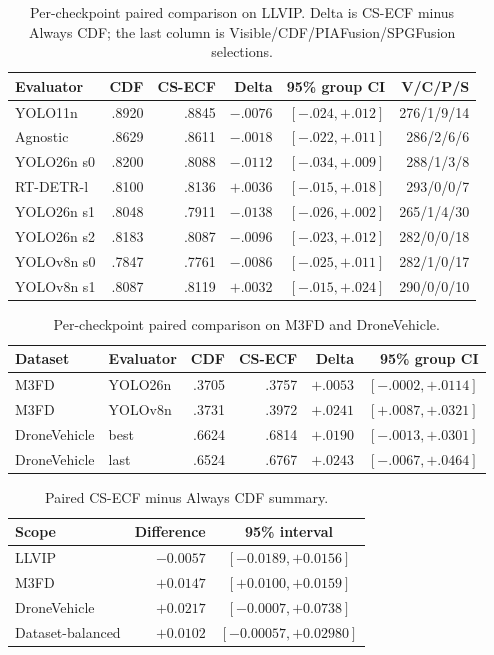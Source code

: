\documentclass[11pt]{article}
\begin{document}
\begin{table}[ht]
\centering
\small
\caption{Per-checkpoint paired comparison on LLVIP. Delta is CS-ECF minus
Always CDF; the last column is Visible/CDF/PIAFusion/SPGFusion selections.}
\label{tab:llvip-cdf}
\begin{tabular}{@{}lrrrrr@{}}
\toprule
Evaluator & CDF & CS-ECF & Delta & 95\% group CI & V/C/P/S \\
\midrule
YOLO11n & .8920 & .8845 & \(-.0076\) & \([-.024,+.012]\) & 276/1/9/14 \\
Agnostic & .8629 & .8611 & \(-.0018\) & \([-.022,+.011]\) & 286/2/6/6 \\
YOLO26n s0 & .8200 & .8088 & \(-.0112\) & \([-.034,+.009]\) & 288/1/3/8 \\
RT-DETR-l & .8100 & .8136 & \(+.0036\) & \([-.015,+.018]\) & 293/0/0/7 \\
YOLO26n s1 & .8048 & .7911 & \(-.0138\) & \([-.026,+.002]\) & 265/1/4/30 \\
YOLO26n s2 & .8183 & .8087 & \(-.0096\) & \([-.023,+.012]\) & 282/0/0/18 \\
YOLOv8n s0 & .7847 & .7761 & \(-.0086\) & \([-.025,+.011]\) & 282/1/0/17 \\
YOLOv8n s1 & .8087 & .8119 & \(+.0032\) & \([-.015,+.024]\) & 290/0/0/10 \\
\bottomrule
\end{tabular}
\end{table}

\begin{table}[ht]
\centering
\small
\caption{Per-checkpoint paired comparison on M3FD and DroneVehicle.}
\label{tab:external-cdf}
\begin{tabular}{@{}llrrrr@{}}
\toprule
Dataset & Evaluator & CDF & CS-ECF & Delta & 95\% group CI \\
\midrule
M3FD & YOLO26n & .3705 & .3757 & \(+.0053\) & \([-.0002,+.0114]\) \\
M3FD & YOLOv8n & .3731 & .3972 & \(+.0241\) & \([+.0087,+.0321]\) \\
DroneVehicle & best & .6624 & .6814 & \(+.0190\) & \([-.0013,+.0301]\) \\
DroneVehicle & last & .6524 & .6767 & \(+.0243\) & \([-.0067,+.0464]\) \\
\bottomrule
\end{tabular}
\end{table}

\begin{table}[h]
\centering
\small
\caption{Paired CS-ECF minus Always CDF summary.}
\begin{tabular}{@{}lrc@{}}
\toprule
Scope & Difference & 95\% interval \\
\midrule
LLVIP & \(-0.0057\) & \([-0.0189,+0.0156]\) \\
M3FD & \(+0.0147\) & \([+0.0100,+0.0159]\) \\
DroneVehicle & \(+0.0217\) & \([-0.0007,+0.0738]\) \\
Dataset-balanced & \(+0.0102\) & \([-0.00057,+0.02980]\) \\
\bottomrule
\end{tabular}
\end{table}
\end{document}
